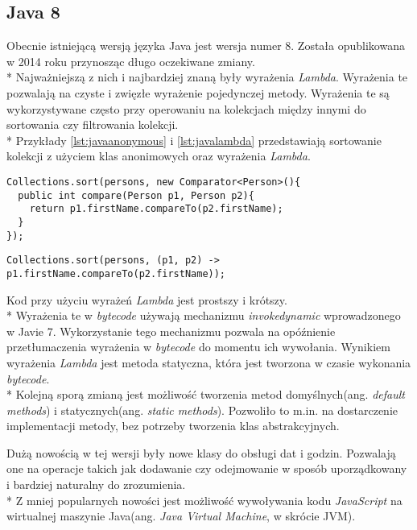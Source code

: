 \subsection{Java 8}
Obecnie istniejącą wersją języka Java jest wersja numer 8. Została opublikowana w 2014 roku przynosząc długo oczekiwane zmiany.\\*
Najważniejszą z nich i najbardziej znaną były wyrażenia \textsl{Lambda}. Wyrażenia te pozwalają na czyste i zwięzłe wyrażenie pojedynczej metody. Wyrażenia te są wykorzystywane często przy operowaniu na kolekcjach między innymi do sortowania czy filtrowania kolekcji.\\*
Przykłady \ref{lst:javaanonymous} i \ref{lst:javalambda} przedstawiają sortowanie kolekcji z użyciem klas anonimowych oraz wyrażenia \textsl{Lambda}. 

\begin{lstlisting}[caption=Przykład sortowania kolekcji w języku Java przy użyciu klas anonimowych, label={lst:javaanonymous}]
Collections.sort(persons, new Comparator<Person>(){
  public int compare(Person p1, Person p2){
    return p1.firstName.compareTo(p2.firstName);
  }
});
\end{lstlisting}
\begin{lstlisting}[caption=Przykład sortowania kolekcji w języku Java przy użyciu wyrażeń Lambda,label={lst:javalambda}]
Collections.sort(persons, (p1, p2) -> p1.firstName.compareTo(p2.firstName));
\end{lstlisting}
Kod przy użyciu wyrażeń \textsl{Lambda} jest prostszy i krótszy.\\*
Wyrażenia te w \textsl{bytecode} używają mechanizmu \textsl{invokedynamic} wprowadzonego w Javie 7. Wykorzystanie tego mechanizmu pozwala na opóźnienie przetłumaczenia wyrażenia w \textsl{bytecode} do momentu ich wywołania. Wynikiem wyrażenia \textsl{Lambda} jest metoda statyczna, która jest tworzona w czasie wykonania \textsl{bytecode}.\\*
Kolejną sporą zmianą jest możliwość tworzenia metod domyślnych(ang. \textsl{default methods}) i statycznych(ang. \textsl{static methods}). Pozwoliło to m.in. na dostarczenie implementacji metody, bez potrzeby tworzenia klas abstrakcyjnych.

Dużą nowością w tej wersji były nowe klasy do obsługi dat i godzin. Pozwalają one na operacje takich jak dodawanie czy odejmowanie w sposób uporządkowany i bardziej naturalny do zrozumienia.\\*
Z mniej popularnych nowości jest możliwość wywoływania kodu \textsl{JavaScript} na wirtualnej maszynie Java(ang. \textsl{Java Virtual Machine}, w skrócie JVM).


